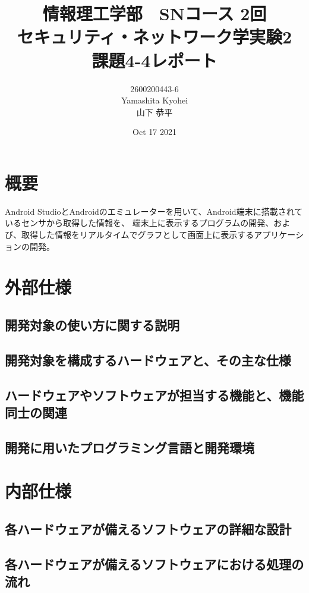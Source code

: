 \documentclass[dvipdfmx,autodetect-engine,titlepage]{jsarticle}
\title{情報理工学部　SNコース 2回\\
セキュリティ・ネットワーク学実験2\\
課題4-4レポート}
\author{2600200443-6\\Yamashita Kyohei\\山下 恭平}
\date{Oct 17 2021}
\begin{document}
\maketitle

\section{概要}
Android StudioとAndroidのエミュレーターを用いて、Android端末に搭載されているセンサから取得した情報を、
端末上に表示するプログラムの開発、および、取得した情報をリアルタイムでグラフとして画面上に表示するアプリケーションの開発。

\section{外部仕様}

 \subsection{開発対象の使い方に関する説明}
 
 \subsection{開発対象を構成するハードウェアと、その主な仕様}
 
 \subsection{ハードウェアやソフトウェアが担当する機能と、機能同士の関連}
 
 \subsection{開発に用いたプログラミング言語と開発環境}



\section{内部仕様}

\subsection{各ハードウェアが備えるソフトウェアの詳細な設計}

\subsection{各ハードウェアが備えるソフトウェアにおける処理の流れ}
\end{document}
